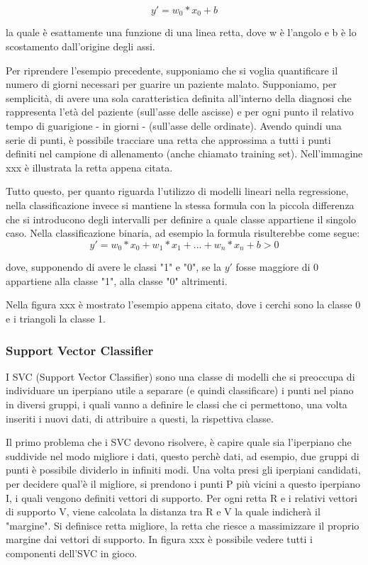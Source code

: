 \documentclass[12pt,italian]{report}
\begin{document}
\[ y' = w_{0} * x_{0} + b\]

la quale è esattamente una funzione di una linea retta, dove w è l'angolo e b è lo scostamento dall'origine degli assi.

Per riprendere l'esempio precedente, supponiamo che si voglia quantificare il numero di giorni necessari per guarire un paziente malato.
Supponiamo, per semplicità, di avere una sola caratteristica definita all'interno della diagnosi che rappresenta l'età del paziente (sull'asse delle ascisse) e per ogni punto il relativo tempo di guarigione - in giorni - (sull'asse delle ordinate). 
Avendo quindi una serie di punti, è possibile tracciare una retta che approssima a tutti i punti definiti nel campione di allenamento (anche chiamato training set). Nell'immagine xxx è illustrata la retta appena citata.

Tutto questo, per quanto riguarda l'utilizzo di modelli lineari nella regressione, nella classificazione invece si mantiene la stessa formula con la piccola differenza che si introducono degli intervalli per definire a quale classe appartiene il singolo caso. Nella classificazione binaria, ad esempio la formula risulterebbe come segue:
\[ y' = w_{0} * x_{0} + w_{1} * x_{1} + ... + w_{n} * x_{n} + b > 0 \]

dove, supponendo di avere le classi "1" e "0", se la $ y' $ fosse maggiore di $ 0 $ appartiene alla classe "1", alla classe "0" altrimenti.

Nella figura xxx è mostrato l'esempio appena citato, dove i cerchi sono la classe 0 e i triangoli la classe 1.

\pagebreak

\subsubsection{Support Vector Classifier}
I SVC (Support Vector Classifier) sono una classe di modelli che si preoccupa di individuare un iperpiano utile a separare (e quindi classificare) i punti nel piano in diversi gruppi, i quali vanno a definire le classi che ci permettono, una volta inseriti i nuovi dati, di attribuire a questi, la rispettiva classe.

Il primo problema che i SVC devono risolvere, è capire quale sia l'iperpiano che suddivide nel modo migliore i dati, questo perchè dati, ad esempio, due gruppi di punti è possibile dividerlo in infiniti modi. 
Una volta presi gli iperpiani candidati, per decidere qual'è il migliore, si prendono i punti P più vicini a questo iperpiano I, i quali vengono definiti vettori di supporto. Per ogni retta R e i relativi vettori di supporto V, viene calcolata la distanza tra R e V la quale indicherà il "margine". Si definisce retta migliore, la retta che riesce a massimizzare il proprio margine dai vettori di supporto. In figura xxx è possibile vedere tutti i componenti dell'SVC in gioco.
\end{document}
